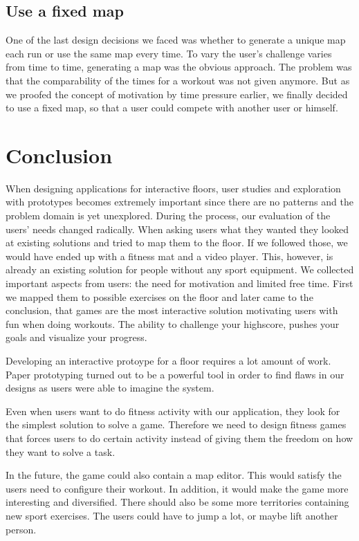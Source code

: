 \documentclass{sigchi}
\begin{document}
  \subsection{Use a fixed map} %
  \label{sub:use_a_fixed_map}

    One of the last design decisions we faced was whether to generate a unique map each run or use the same map every time. To vary the user's challenge varies from time to time, generating a map was the obvious approach. The problem was that the comparability of the times for a workout was not given anymore. But as we proofed the concept of motivation by time pressure earlier, we finally decided to use a fixed map, so that a user could compete with another user or himself.

\clearpage

\section{Conclusion}

  When designing applications for interactive floors, user studies and exploration with prototypes becomes extremely important since there are no patterns and the problem domain is yet unexplored. During the process, our evaluation of the users' needs changed radically. When asking users what they wanted they looked at existing solutions and tried to map them to the floor. If we followed those, we would have ended up with a fitness mat and a video player. This, however, is already an existing solution for people without any sport equipment. We collected important aspects from users: the need for motivation and limited free time. First we mapped them to possible exercises on the floor and later came to the conclusion, that games are the most interactive solution motivating users with fun when doing workouts. The ability to challenge your highscore, pushes your goals and visualize your progress. 

  Developing an interactive protoype for a floor requires a lot amount of work. Paper prototyping turned out to be a powerful tool in order to find flaws in our designs as users were able to imagine the system.

  Even when users want to do fitness activity with our application, they look for the simplest solution to solve a game. Therefore we need to design fitness games that forces users to do certain activity instead of giving them the freedom on how they want to solve a task.

  In the future, the game could also contain a map editor. This would satisfy the users need to configure their workout. In addition, it would make the game more interesting and diversified. There should also be some more territories containing new sport exercises. The users could have to jump a lot, or maybe lift another person.
\end{document}
